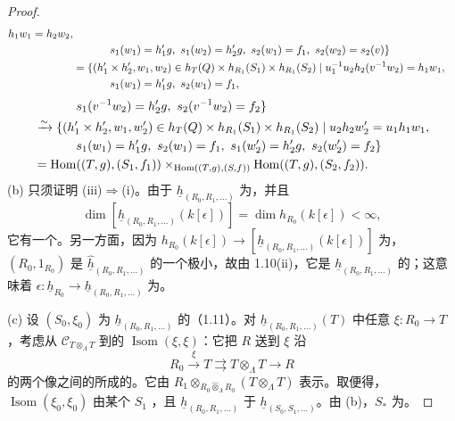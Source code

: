 \begin{proof}
\[\begin{aligned}
 h_1w_1=h_2w_2,\\
&\hspace{12mm}s_1(w_1)=h_1'g,\ s_1(w_2)=h_2'g,\ s_2(w_1)=f_1,\ s_2(w_2)=s_2(v)\}\\
&=\{(h_1'\times h_2',w_1,w_2)\in h_T(Q)\times h_{R_1}(S_1)\times h_{R_1}(S_2)\mid
 u_1^{-1}u_2h_2(v^{-1}w_2)=h_1w_1,\\
&\hspace{12mm}s_1(w_1)=h_1'g,\ s_2(w_1)=f_1,
\end{aligned}
\]
\[
\begin{aligned}
{}&\hspace{12mm}s_1(v^{-1}w_2)=h_2'g,\ s_2(v^{-1}w_2)=f_2\}\\
&\xrightarrow\sim\{(h_1'\times h_2',w_1,w_2')\in h_T(Q)\times h_{R_1}(S_1)\times h_{R_1}(S_2)\mid
 u_2h_2w_2'=u_1h_1w_1,\\
&\hspace{12mm}s_1(w_1)=h_1'g,\ s_2(w_1)=f_1,\ s_1(w_2')=h_2'g,\ s_2(w_2')=f_2\}\\
&=\operatorname{Hom}((T,g),(S_1,f_1))
 \times_{\operatorname{Hom}((T,g),(S,f))}\operatorname{Hom}((T,g),(S_2,f_2)).
\end{aligned}
\]
(b) 只须证明 (iii)$\Rightarrow$(i)。由于 $\underline h_{(R_0,R_1,\ldots)}$ 为，并且
\[\dim[\underline h_{(R_0,R_1,\ldots)}(k[\epsilon])]=\dim h_{R_0}(k[\epsilon])<\infty,\]
它有一个。另一方面，因为
$h_{R_0}(k[\epsilon])\to[\underline h_{(R_0,R_1,\ldots)}(k[\epsilon])]$ 为，$(R_0,1_{R_0})$ 是 $\widehat{\underline h}_{(R_0,R_1,\ldots)}$ 的一个极小，故由 1.10(ii)，它是 $\underline h_{(R_0,R_1,\ldots)}$ 的；这意味着 $\epsilon:\underline h_{R_0}\to\underline h_{(R_0,R_1,\ldots)}$ 为。

(c) 设 $(S_0,\xi_0)$ 为 $\underline h_{(R_0,R_1,\ldots)}$ 的（1.11）。对 $\underline h_{(R_0,R_1,\ldots)}(T)$ 中任意 $\xi:R_0\to T$，考虑从 $\mathcal C_{T\otimes_\Lambda T}$ 到的 $\operatorname{Isom}(\xi,\xi)$：它把 $R$ 送到 $\xi$ 沿
\[R_0\xrightarrow\xi T\rightrightarrows T\otimes_\Lambda T\longrightarrow R\]
的两个像之间的所成的。它由 $R_1\otimes_{R_0\widehat\otimes_\Lambda R_0}(T\otimes_\Lambda T)$ 表示。取便得，$\operatorname{Isom}(\xi_0,\xi_0)$ 由某个 $S_1$ ，且 $\underline h_{(R_0,R_1,\ldots)}$ 于 $\underline h_{(S_0,S_1,\ldots)}$。由 (b)，$S_*$ 为。
\end{proof}
